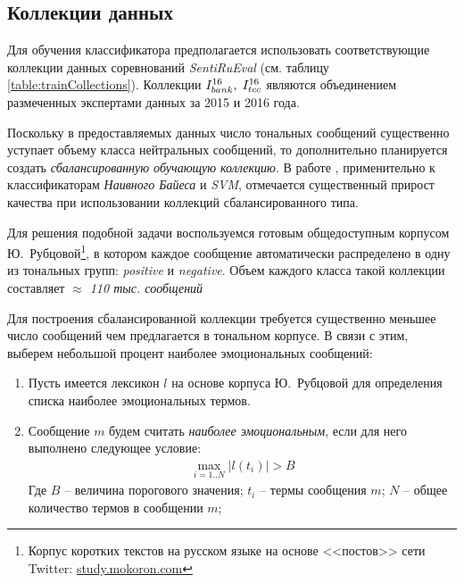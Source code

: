 \subsection{Коллекции данных}
    \label{sec:train}
    Для обучения классификатора предполагается использовать соответствующие
    коллекции данных соревнований {\it SentiRuEval} (см. таблицу
    \ref{table:trainCollections}).
    Коллекции $I_{bank}^{16}, \hspace{0.1cm} I_{tcc}^{16}$ являются объединением
    размеченных экспертами данных за 2015 и 2016 года.

    

    Поскольку в предоставляемых
    данных число тональных сообщений существенно уступает объему класса
    нейтральных сообщений, то дополнительно планируется создать {\it сбалансированную
    обучающую коллекцию}.
    В работе \cite{svmAdvantages}, применительно к классификаторам {\it
    Наивного Байеса} и {\it SVM}, отмечается существенный прирост качества при
    использовании коллекций сбалансированного типа.

    Для решения подобной задачи воспользуемся готовым общедоступным корпусом
    Ю.~Рубцовой\footnote{
        Корпус коротких текстов на русском языке на основе <<постов>> сети
        Twitter: \url{study.mokoron.com}
    }, в котором каждое сообщение автоматически распределено в одну из тональных
    групп:
    {\it positive} и {\it negative}.
    Объем каждого класса такой коллекции составляет {\it $\approx$ 110 тыс.
    сообщений}

    Для построения сбалансированной коллекции требуется существенно меньшее
    число сообщений чем предлагается в тональном корпусе.
    В связи с этим, выберем небольшой процент наиболее эмоциональных сообщений:
    \begin{enumerate}
        \item Пусть имеется лексикон $l$ на основе корпуса Ю.~Рубцовой для определения
            списка наиболее эмоциональных термов.
        \item Сообщение $m$ будем считать {\it наиболее эмоциональным},
            если для него выполнено следующее условие:
            \begin{gather}
                \max\limits_{i=1..N} |l(t_i)| > B
            \end{gather}
            Где $B$ -- величина порогового значения; \hspace{0.5pt}
            $t_i$ -- термы сообщения $m$; \hspace{0.5pt}
            $N$ -- общее количество термов в сообщении $m$;
    \end{enumerate}

